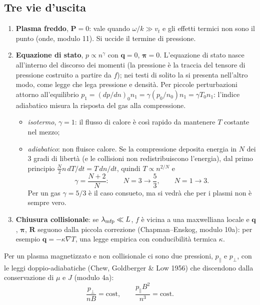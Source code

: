 \subsection{Tre vie d'uscita}
\begin{enumerate}
\item \textbf{Plasma freddo}, $\mathbf{P}=0$: vale quando $\omega/k\gg v_t$ e gli effetti termici non sono il punto (onde, modulo 11). Si uccide il termine di pressione.
\item \textbf{Equazione di stato}, $p\propto n^\gamma$ con $\mathbf{q}=0$, $\boldsymbol\pi=0$. L'equazione di stato nasce all'interno del discorso dei momenti (la pressione è la traccia del tensore di pressione costruito a partire da $f$); nei testi di solito la si presenta nell'altro modo, come legge che lega pressione e densità. Per piccole perturbazioni attorno all'equilibrio $p_1=(dp/dn)_0n_1=\gamma(p_0/n_0)n_1=\gamma T_0n_1$: l'indice adiabatico misura la risposta del gas alla compressione.
\begin{itemize}
\item \textit{isotermo}, $\gamma=1$: il flusso di calore è così rapido da mantenere $T$ costante nel mezzo;
\item \textit{adiabatico}: non fluisce calore. Se la compressione deposita energia in $N$ dei 3 gradi di libertà (e le collisioni non redistribuiscono l'energia), dal primo principio $\frac N2n\,dT/dt=T\,dn/dt$, quindi $T\propto n^{2/N}$ e
\begin{equation}
\gamma=\frac{N+2}{N}:\qquad N=3\to\frac53,\qquad N=1\to3 .
\end{equation}
Per un gas $\gamma=5/3$ è il caso consueto, ma si vedrà che per i plasmi non è sempre vero.
\end{itemize}
\item \textbf{Chiusura collisionale}: se $\lambda_{\rm mfp}\ll L$, $f$ è vicina a una maxwelliana locale e $\mathbf{q}$, $\boldsymbol\pi$, $\mathbf{R}$ seguono dalla piccola correzione (Chapman--Enskog, modulo 10a): per esempio $\mathbf{q}=-\kappa\nabla T$, una legge empirica con conducibilità termica $\kappa$.
\end{enumerate}
Per un plasma magnetizzato e non collisionale ci sono due pressioni, $p_\parallel$ e $p_\perp$, con le leggi doppio-adiabatiche (Chew, Goldberger \& Low 1956) che discendono dalla conservazione di $\mu$ e $J$ (modulo 4a):
\begin{equation}
\frac{p_\perp}{nB}=\mathrm{cost},\qquad\frac{p_\parallel B^2}{n^3}=\mathrm{cost}.
\end{equation}

